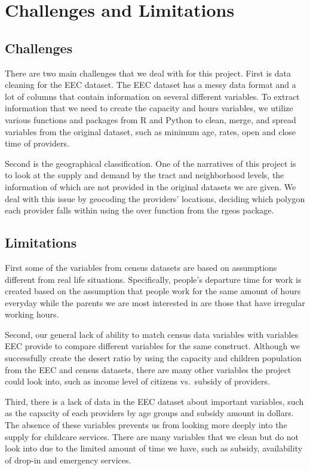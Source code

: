 \documentclass[man]{apa6}
\begin{document}
\section{Challenges and Limitations}\label{challenges-and-limitations}

\subsection{Challenges}\label{challenges}

There are two main challenges that we deal with for this project. First
is data cleaning for the EEC dataset. The EEC dataset has a messy data
format and a lot of columns that contain information on several
different variables. To extract information that we need to create the
capacity and hours variables, we utilize various functions and packages
from R and Python to clean, merge, and spread variables from the
original dataset, such as minimum age, rates, open and close time of
providers.

Second is the geographical classification. One of the narratives of this
project is to look at the supply and demand by the tract and
neighborhood levels, the information of which are not provided in the
original datasets we are given. We deal with this issue by geocoding the
providers' locations, deciding which polygon each provider falls within
using the over function from the rgeos package.

\subsection{Limitations}\label{limitations}

First some of the variables from census datasets are based on
assumptions different from real life situations. Specifically, people's
departure time for work is created based on the assumption that people
work for the same amount of hours everyday while the parents we are most
interested in are those that have irregular working hours.

Second, our general lack of ability to match census data variables with
variables EEC provide to compare different variables for the same
construct. Although we successfully create the desert ratio by using the
capacity and children population from the EEC and census datasets, there
are many other variables the project could look into, such as income
level of citizens vs.~subsidy of providers.

Third, there is a lack of data in the EEC dataset about important
variables, such as the capacity of each providers by age groups and
subsidy amount in dollars. The absence of these variables prevents us
from looking more deeply into the supply for childcare services. There
are many variables that we clean but do not look into due to the limited
amount of time we have, such as subsidy, availability of drop-in and
emergency services.
\end{document}
